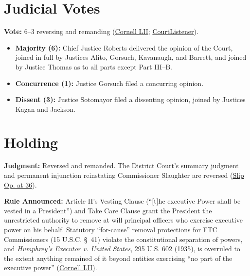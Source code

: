 \documentclass[12pt]{article}
\begin{document}
\section{Judicial Votes}

\textbf{Vote:} 6--3 reversing and remanding (\href{https://www.law.cornell.edu/supremecourt/text/25-332}{Cornell LII}; \href{https://www.courtlistener.com/opinion/10881681/trump-v-slaughter/}{CourtListener}).

\begin{itemize}
    \item \textbf{Majority (6):} Chief Justice Roberts delivered the opinion of the Court, joined in full by Justices Alito, Gorsuch, Kavanaugh, and Barrett, and joined by Justice Thomas as to all parts except Part III--B.
    \item \textbf{Concurrence (1):} Justice Gorsuch filed a concurring opinion.
    \item \textbf{Dissent (3):} Justice Sotomayor filed a dissenting opinion, joined by Justices Kagan and Jackson.
\end{itemize}

\section{Holding}

\textbf{Judgment:} Reversed and remanded. The District Court's summary judgment and permanent injunction reinstating Commissioner Slaughter are reversed (\href{https://www.supremecourt.gov/opinions/25pdf/25-322_new_4gcj.pdf}{Slip Op. at 36}).

\textbf{Rule Announced:} Article II's Vesting Clause (``[t]he executive Power shall be vested in a President'') and Take Care Clause grant the President the unrestricted authority to remove at will principal officers who exercise executive power on his behalf. Statutory ``for-cause'' removal protections for FTC Commissioners (15 U.S.C. \S~41) violate the constitutional separation of powers, and \textit{Humphrey's Executor v. United States}, 295 U.S. 602 (1935), is overruled to the extent anything remained of it beyond entities exercising ``no part of the executive power'' (\href{https://www.law.cornell.edu/supremecourt/text/25-332}{Cornell LII}).
\end{document}
